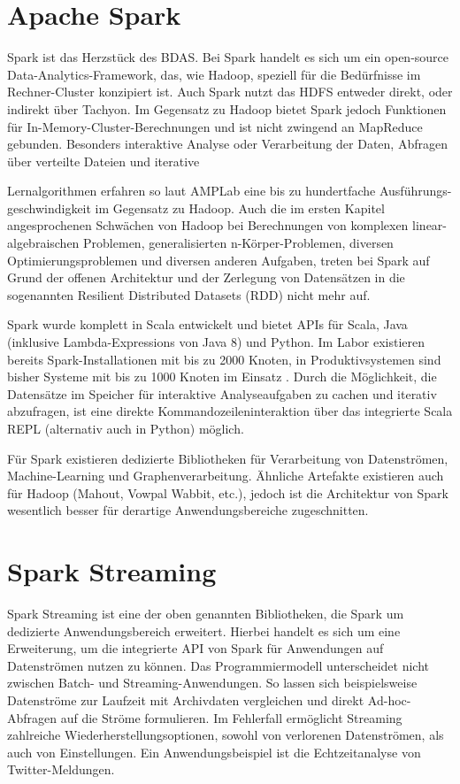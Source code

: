 \section{Apache Spark}
\label{section:apache Spark}

Spark ist das Herzstück des BDAS. Bei Spark handelt es sich um ein open-source Data-Analytics-Framework, das, wie Hadoop, speziell für die Bedürfnisse im Rechner-Cluster konzipiert ist. Auch Spark nutzt das HDFS entweder direkt, oder indirekt über Tachyon. Im Gegensatz zu Hadoop bietet Spark jedoch Funktionen für In-Memory-Cluster-Berechnungen und ist nicht zwingend an MapReduce gebunden. Besonders interaktive Analyse oder Verarbeitung der Daten, Abfragen über verteilte Dateien und iterative 

Lernalgorithmen erfahren so laut AMPLab eine bis zu hundertfache Ausführungs-geschwindigkeit im Gegensatz zu Hadoop. Auch die im ersten Kapitel angesprochenen Schwächen von Hadoop bei Berechnungen von komplexen linear-algebraischen Problemen, generalisierten n-Körper-Problemen, diversen Optimierungsproblemen und diversen anderen Aufgaben, treten bei Spark auf Grund der offenen Architektur und der Zerlegung von Datensätzen in die sogenannten Resilient Distributed Datasets (RDD) nicht mehr auf.

Spark wurde komplett in Scala entwickelt und bietet APIs für Scala, Java (inklusive Lambda-Expressions von Java 8) und Python. Im Labor existieren bereits Spark-Installationen mit bis zu 2000 Knoten, in Produktivsystemen sind bisher Systeme mit bis zu 1000 Knoten im Einsatz . Durch die Möglichkeit, die Datensätze im Speicher für interaktive Analyseaufgaben zu cachen und iterativ abzufragen, ist eine direkte Kommandozeileninteraktion über das integrierte Scala REPL (alternativ auch in Python) möglich. 

Für Spark existieren dedizierte Bibliotheken für Verarbeitung von Datenströmen, Machine-Learning und Graphenverarbeitung. Ähnliche Artefakte existieren auch für Hadoop (Mahout, Vowpal Wabbit, etc.), jedoch ist die Architektur von Spark wesentlich besser für derartige Anwendungsbereiche zugeschnitten. 
   
\section{Spark Streaming}
\label{section:spark Streaming}


Spark Streaming ist eine der oben genannten Bibliotheken, die Spark um dedizierte Anwendungsbereich erweitert. Hierbei handelt es sich um eine Erweiterung, um die integrierte API von Spark für Anwendungen auf Datenströmen nutzen zu können. Das Programmiermodell unterscheidet nicht zwischen Batch- und Streaming-Anwendungen. So lassen sich beispielsweise Datenströme zur Laufzeit mit Archivdaten vergleichen und direkt Ad-hoc-Abfragen auf die Ströme formulieren. Im Fehlerfall ermöglicht Streaming zahlreiche Wiederherstellungsoptionen, sowohl von verlorenen Datenströmen, als auch von Einstellungen. Ein Anwendungsbeispiel ist die Echtzeitanalyse von Twitter-Meldungen. 

